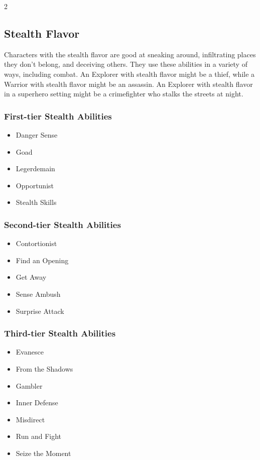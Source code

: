 \begin{multicols}{2}
\subsection{Stealth Flavor}

Characters with the stealth flavor are good at sneaking around, infiltrating places they don’t belong, and deceiving others. They use these abilities in a variety of ways, including combat. An Explorer with stealth flavor might be a thief, while a Warrior with stealth flavor might be an assassin. An Explorer with stealth flavor in a superhero setting might be a crimefighter who stalks the streets at night.

\subsubsection{First-tier Stealth Abilities}

\begin{itemize} 
\item Danger Sense
\item Goad
\item Legerdemain
\item Opportunist
\item Stealth Skills
\end{itemize}

\subsubsection{Second-tier Stealth Abilities}

\begin{itemize} 
\item Contortionist
\item Find an Opening
\item Get Away
\item Sense Ambush
\item Surprise Attack
\end{itemize}

\subsubsection{Third-tier Stealth Abilities}

\begin{itemize}
\item Evanesce
\item From the Shadows
\item Gambler
\item Inner Defense
\item Misdirect
\item Run and Fight
\item Seize the Moment
\end{itemize}


\end{multicols}
